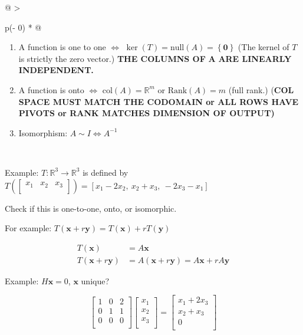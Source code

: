 \documentclass[
]{article}
\newcounter{example}
\begin{document}
\begin{longtable}[]{@{}
  >{\raggedright\arraybackslash}p{(\columnwidth - 0\tabcolsep) * }@{}}
\toprule
\begin{minipage}[b]{\linewidth}\raggedright
\begin{enumerate}
\def\labelenumi{\arabic{enumi}.}
\item
  A function is one to one $\Leftrightarrow$
  $\ker(T) = \text{null}(A) = \left\{ \mathbf{0} \right\}$ (The
  kernel of $T$ is strictly the zero vector.) \textbf{THE COLUMNS OF}
  $\mathbf{A}$ \textbf{ARE LINEARLY INDEPENDENT.}
\item
  A function is onto $\Leftrightarrow$
  $\text{col}(A) = \mathbb{R}^{m}$ or $\text{Rank}{(A)} = m$ (full
  rank.) (\textbf{COL SPACE MUST MATCH THE CODOMAIN or ALL ROWS HAVE
  PIVOTS or RANK MATCHES DIMENSION OF OUTPUT)}
\item
  Isomorphism: $A\sim I \Leftrightarrow A^{- 1}$
\end{enumerate}
\end{minipage} \\
\midrule
\endhead
\bottomrule
\end{longtable}

Example: $T:\mathbb{R}^{3} \rightarrow \mathbb{R}^{3}$ is defined by
$T\left( \begin{bmatrix}
x_{1} & x_{2} & x_{3} \\
\end{bmatrix} \right) = \left\lbrack x_{1} - 2x_{2},\ x_{2} + x_{3},\  - 2x_{3} - x_{1} \right\rbrack$

Check if this is one-to-one, onto, or isomorphic.

For example:
$T\left( \mathbf{x} + r\mathbf{y} \right) = T\left( \mathbf{x} \right) + rT\left( \mathbf{y} \right)$

\begin{align*}
T\left( \mathbf{x} \right) &= A\mathbf{x}
 \\
T\left( \mathbf{x} + r\mathbf{y} \right) &= A\left( \mathbf{x} + r\mathbf{y} \right) = A\mathbf{x} + rA\mathbf{y}
\end{align*}


Example: $H\mathbf{x} = 0$, $\mathbf{x}$ unique?

$$\begin{bmatrix}
1 & 0 & 2 \\
0 & 1 & 1 \\
0 & 0 & 0 \\
\end{bmatrix}\begin{bmatrix}
x_{1} \\
x_{2} \\
x_{3} \\
\end{bmatrix} = \begin{bmatrix}
x_{1} + 2x_{3} \\
x_{2} + x_{3} \\
0 \\
\end{bmatrix}$$
\end{document}
